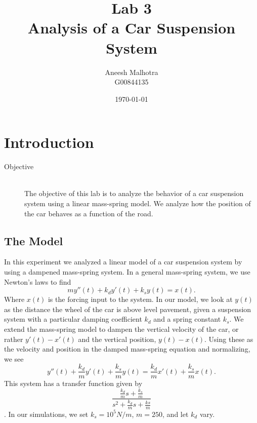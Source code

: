 \documentclass{article}
\title{Lab 3 \\ Analysis of a Car Suspension System} %
\author{Aneesh Malhotra \\ G00844135} %
\date{\today} %
\begin{document}
\maketitle %




\section{Introduction}



\begin{description}
\item[Objective] \hfill \\
The objective of this lab is to analyze the behavior of a car suspension system using a linear mass-spring model. We analyze how the position of the car behaves as a function of the road.
\end{description}

\subsection{The Model} 
In this experiment we analyzed a linear model of a car suspension system by using a dampened mass-spring system. In a general mass-spring system, we use Newton's laws to find $$my''(t)  + k_d y'(t) + k_s y(t) = x(t).$$ Where $x(t)$ is the forcing input to the system. In our model, we look at $y(t)$ as the distance the wheel of the car is above level pavement, given a suspension system with a particular damping coefficient $k_d$ and a spring constant $k_s$. We extend the mass-spring model to dampen the vertical velocity of the car, or rather $y'(t) -x'(t)$ and the vertical position, $y(t) - x(t)$. Using these as the velocity and position in the damped mass-spring equation and normalizing, we see $$ y''(t) +\frac{k_d}{m} y'(t) + \frac{k_s}{m} y(t) = \frac{k_d}{m} x'(t) + \frac{k_s}{m}x(t).$$ This system has a transfer function given by $$\frac{\frac{k_d}{m}s + \frac{k_s}{m}}{s^2 + \frac{k_d}{m} s + \frac{ks}{m}}$$. In our simulations, we set $k_s = 10^5 N/m$, $m = 250$, and let $k_d$ vary.
\end{document}
